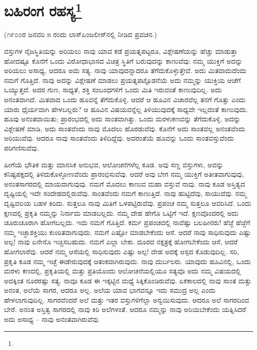 
\chapter[ಬಹಿರಂಗ ರಹಸ್ಯ]{ಬಹಿರಂಗ ರಹಸ್ಯ\protect\footnote{}}

\begin{center}
(೧೯೦೦ರ ಜನವರಿ ೫ ರಂದು ಲಾಸ್‌ಏಂಜಲೀಸ್‌ನಲ್ಲಿ ನೀಡಿದ ಪ್ರವಚನ.)
\end{center}

ವಸ್ತುಗಳ ನೈಜಸ್ಥಿತಿಯನ್ನು ಅರಿಯಲು ನಾವು ಯಾವ ಕಡೆ ಪ್ರಯತ್ನಪಟ್ಟರೂ, ವಿಶ್ಲೇಷಣೆಯನ್ನು ಹೆಚ್ಚು ಮಾಡುತ್ತಾ ಹೋದಷ್ಟೂ ಕೊನೆಗೆ ಒಂದು ವಿರೋಧಾಭಾಸದ ವಿಚಿತ್ರ ಸ್ಥಿತಿಗೆ ಬರುವುದನ್ನು ಕಾಣುವೆವು: ನಮ್ಮ ಯುಕ್ತಿಗೆ ಅದನ್ನು ಅರಿಯಲು ಅಸಾಧ್ಯ, ಆದರೂ ಅದು ಸತ್ಯ. ನಾವು ಯಾವುದನ್ನಾದರೂ ತೆಗೆದುಕೊಳ್ಳುತ್ತೇವೆ. ಅದು ಮಿತವಾದುದೆಂದು ನಮಗೆ ಗೊತ್ತಿದೆ. ನಾವು ಅದನ್ನು ವಿಶ್ಲೇಷಣೆ ಮಾಡಲು ಪ್ರಯತ್ನ\break ಪಟ್ಟೊಡನೆಯೆ ಅದು ನಮ್ಮನ್ನು ಯುಕ್ತಿಯ ಆಚೆಗೆ ಒಯ್ಯುತ್ತದೆ. ಅದರ ಗುಣ, ಸಾಧ್ಯತೆ, ಶಕ್ತಿ ಸಂಬಂಧಗಳಿಗೆ ಒಂದು ಮಿತಿ ಇರುವಂತೆ ಕಾಣುವುದಿಲ್ಲ. ಅದು ಅನಂತವಾಗಿದೆ. ಮಿತವಾದ ಒಂದು ಹೂವನ್ನೆ ತೆಗೆದುಕೊಳ್ಳಿ. ಆದರೆ ಆ ಹೂವಿನ ವಿಚಾರವೆಲ್ಲ ತನಗೆ ಗೊತ್ತು ಎಂದು ಯಾರು ಧೈರ್ಯವಾಗಿ ಹೇಳಬಲ್ಲರು? ಆ ಹೂವಿನ ವಿಷಯವನ್ನೆಲ್ಲ ತಿಳಿಯುವುದಕ್ಕೆ ಸಾಧ್ಯವೇ ಇಲ್ಲದಂತೆ ಕಾಣುವುದು. ಹೂವು ಅನಂತವಾಯಿತು; ಪ್ರಾರಂಭದಲ್ಲಿ ಅದು ಸಾಂತವಾಗಿತ್ತು. ಒಂದು ಮರಳುಕಣವನ್ನು ತೆಗೆದುಕೊಳ್ಳಿ. ಅದನ್ನು ವಿಶ್ಲೇಷಣೆ ಮಾಡಿ, ಅದು ಸಾಂತವೆಂದು ನಾವು ಮೊದಲು ಹೊರಡುವೆವು. ಕೊನೆಗೆ ಅದು ಸಾಂತವಲ್ಲ ಅನಂತವೆಂದು ಅರಿಯುವೆವು. ಆದರೂ ನಾವು ಸಾಂತವೆಂದು ತಿಳಿದಿದ್ದೆವು. ಅದರಂತೆಯೆ ಹೂವನ್ನು ಒಂದು ಸಾಂತವಸ್ತುವೆಂದು ಪರಿಗಣಿಸುವೆವು.

ಹೀಗೆಯೆ ಭೌತಿಕ ಮತ್ತು ಮಾನಸಿಕ ಅನುಭವ, ಆಲೋಚನೆಗಳೆಲ್ಲ ಕೂಡ. ಅವು ಸಣ್ಣ ವಸ್ತುಗಳು, ಅವನ್ನು ಕನಿಷ್ಟಪಕ್ಷದಲ್ಲಿ ತಿಳಿದುಕೊಳ್ಳೋಣವೆಂದು ಪ್ರಾರಂಭಿಸುವೆವು. ಆದರೆ ಅವು ಬೇಗ ನಮ್ಮ ಯುಕ್ತಿಗೆ ಅತೀತವಾಗುವುವು, ಅನಂತಸಾಗರದಲ್ಲಿ ಮಾಯವಾಗುವುವು. ನಮಗೆ ಮೊದಲು ಕಾಣುವ ಮಹಾ ವಸ್ತುವೆ ನಾವು. ನಾವು ಕೂಡ ಅಸ್ತಿತ್ವದ ದೃಷ್ಟಿಯಲ್ಲಿ ಇದೇ ಸಂದೇಹದಲ್ಲಿರುವೆವು. ಸಾಂತವೆಂದು ನಮಗೆ ಕಾಣುತ್ತಿದೆ. ನಾವು ಹುಟ್ಟಿದೆವು, ಸಾಯುವೆವು. ನಮ್ಮ ದೃಷ್ಟಿವಲಯ ಬಹಳ ಕಿರಿದು. ಸುತ್ತಲೂ ನಾವು ಮಿತಿಗೆ ಒಳಪಟ್ಟಿರುವೆವು. ಪ್ರಪಂಚ ನಮ್ಮ ಸುತ್ತಲೂ ಆವರಿಸಿದೆ. ಒಂದು ಕ್ಷಣದಲ್ಲಿ ಪ್ರಕೃತಿ ನಮ್ಮನ್ನು ನಿರ್ನಾಮ ಮಾಡಬಲ್ಲದು. ನಮ್ಮ ದೇಹ ಹೇಗೊ ಒಟ್ಟಿಗೆ ಇದೆ. ಕ್ಷಣವೊಂದರಲ್ಲಿ ಅದು ಚೂರುಚೂರಾಗಿ ಹೋಗಬಲ್ಲದು. ಇದು ನಮಗೆ ಗೊತ್ತಿದೆ. ಕರ್ಮ ಪ್ರಪಂಚದಲ್ಲಿ ನಾವೆಷ್ಟು ಬಲಹೀನರು! ಹೆಜ್ಜೆ ಹೆಜ್ಜೆಗೆ ನಮ್ಮ ಇಚ್ಛಾಶಕ್ತಿಯು ಕುಂಠಿತವಾಗುವುದು. ನಮಗೆ ಎಷ್ಟೋ ಮಾಡಬೇಕೆಂದು ಆಸೆ. ಆದರೆ ನಾವು ಸಾಧಿಸುವುದು ಎಷ್ಟು ಅಲ್ಪ! ನಾವು ಏನೇನೊ ಇಚ್ಚಿಸಬಹುದು. ನಮಗೆ ಎಲ್ಲಾ ಬೇಕು. ದೂರದ ನಕ್ಷತ್ರಕ್ಕೆ ಹೋಗಬೇಕೆಂದು ಆಸೆ, ಆದರೆ ಹೋಗಲಾರೆವು. ಆದರೆ ನಮ್ಮ ಆಸೆಯಲ್ಲಿ ಸಾಧಿಸುವುದು ಎಷ್ಟು ಅಲ್ಪ! ದೇಹ ಅದಕ್ಕೆ ಆಸ್ಪದ ಕೊಡುವುದಿಲ್ಲ. ಸರಿ, ಪ್ರಕೃತಿ ಕೂಡ ನಮ್ಮ ಇಚ್ಛೆ ಈಡೇರುವುದಕ್ಕೆ ಆತಂಕವಾಗಿರುವುದು. ನಾವು ದುರ್ಬಲರು. ಯಾವುದು ಹೂವಿನಲ್ಲಿ, ಒಂದು ಮರಳು ಕಣದಲ್ಲಿ, ಪ್ರಕೃತಿಯಲ್ಲಿ ಮತ್ತು ಪ್ರತಿಯೊಂದು ಆಲೋಚನೆಯಲ್ಲಿಯೂ ಸತ್ಯವೊ ಅದು ನಮ್ಮ ವಿಷಯದಲ್ಲಿ ಅದಕ್ಕಿಂತ ನೂರರಷ್ಟು ಸತ್ಯ. ನಾವೂ ಕೂಡ ಈ ಇಕ್ಕಟ್ಟಿನ ಮಧ್ಯೆ ಸಿಕ್ಕಿಕೊಂಡಿರುವೆವು. ಏಕಕಾಲದಲ್ಲಿ ನಾವು ಸಾಂತ ಮತ್ತು ಅನಂತ, ಅಲೆಯೆ ಸಾಗರ, ಆದರೂ ಅಲ್ಲ. ಅಲೆಯ ಯಾವ ಭಾಗವನ್ನೂ ಇದು ಸಮುದ್ರ ಅಲ್ಲ ಎಂದು ಹೇಳಲಾಗುವುದಿಲ್ಲ. ಸಾಗರವೆಂದರೆ ಅಲೆ ಮತ್ತು ಇತರ ವಸ್ತುಗಳಿಗೆಲ್ಲಾ ಅನ್ವಯಿಸುವುದು. ಆದರೂ ಅಲೆ ಸಾಗರದಿಂದ ಬೇರೆ. ಅನಂತ ಅಸ್ತಿತ್ವ ಸಾಗರದಲ್ಲಿ ನಾವು ಕಿರಿ ಅಲೆಗಳಂತೆ. ಆದರೂ ನಮ್ಮನ್ನು ನಾವು ಅರಿಯಬೇಕೆಂದು ಯತ್ನಿಸಿದರೆ ಅದು ಅಸಾಧ್ಯ – ನಾವು ಅನಂತವಾಗಿರುವೆವು.


